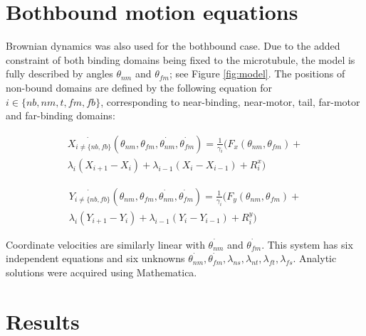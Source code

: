\documentclass[9pt,twocolumn,twoside]{pnas-new}
\begin{document}
{  \section*{Bothbound motion equations}
  Brownian dynamics was also used for the bothbound case. Due to the added constraint of both binding domains being fixed to the microtubule, the model is fully described by angles $\theta_{nm}$ and $\theta_{fm}$; see Figure \ref{fig:model}. The positions of non-bound domains are defined by the following equation for $i \in \{nb, nm, t, fm, fb\}$, corresponding to near-binding, near-motor, tail, far-motor and far-binding domains:

  \begin{multline}
    \dot{X_{i\neq\{nb, fb\}}}\left(\theta_{nm},\theta_{fm}, \dot{\theta_{nm}}, \dot{\theta_{fm}}\right) = \frac{1}{\gamma_i}\big(F_x(\theta_{nm}, \theta_{fm}) + \\
    \lambda_i\left(X_{i+1}-X_i\right) + \lambda_{i-1}\left(X_i-X_{i-1}\right) + R^x_i\big)
    \label{eq:bb-system}
  \end{multline}

  \begin{multline}
    \dot{Y_{i\neq\{nb, fb\}}}\left(\theta_{nm},\theta_{fm}, \dot{\theta_{nm}}, \dot{\theta_{fm}}\right) = \frac{1}{\gamma_i}\big(F_y(\theta_{nm}, \theta_{fm}) + \\
    \lambda_i\left(Y_{i+1}-Y_i\right) + \lambda_{i-1}\left(Y_i-Y_{i-1}\right) + R^y_i\big)
    \label{eq:bb-system}
  \end{multline}

  Coordinate velocities are similarly linear with $\dot{\theta_{nm}}$ and $\dot{\theta_{fm}}$. This system has six independent equations and six unknowns $\dot{\theta_{nm}}, \dot{\theta_{fm}}, \lambda_{ns}, \lambda_{nt}, \lambda_{ft}, \lambda_{fs}$. Analytic solutions were acquired using Mathematica.
}


\section{Results}

\end{document}
